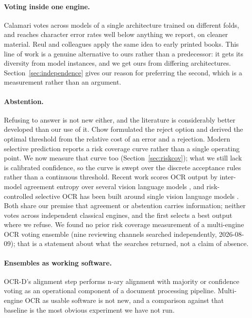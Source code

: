 \documentclass[11pt,a4paper]{article}
\begin{document}
\paragraph{Voting inside one engine.} Calamari \cite{wick2018} votes across models of a
single architecture trained on different folds, and reaches character error rates well
below anything we report, on cleaner material. Reul and colleagues \cite{reul2018} apply
the same idea to early printed books. This line of work is a genuine alternative to ours
rather than a predecessor: it gets its diversity from model instances, and we get ours
from differing architectures. Section~\ref{sec:independence} gives our reason for
preferring the second, which is a measurement rather than an argument.

\paragraph{Abstention.} Refusing to answer is not new either, and the literature is
considerably better developed than our use of it. Chow \cite{chow1957,chow1970}
formulated the reject option and derived the optimal threshold from the relative cost of
an error and a rejection. Modern selective prediction \cite{elyaniv2010,geifman2017}
reports a risk coverage curve rather than a single operating point. We now measure that
curve too (Section~\ref{sec:riskcov}); what we still lack is calibrated confidence, so
the curve is swept over the discrete acceptance rules rather than a continuous
threshold. Recent work scores OCR output by inter-model agreement entropy over several
vision language models \cite{zhang2025consensus}, and risk-controlled selective OCR has
been built around single vision language models \cite{geomrisk2026}. Both share our
premise that agreement or abstention carries information; neither votes across
independent classical engines, and the first selects a best output where we refuse. We
found no prior risk coverage measurement of a multi-engine OCR voting ensemble (nine
reviewing channels searched independently, 2026-08-09); that is a statement about what
the searches returned, not a claim of absence.

\paragraph{Ensembles as working software.} OCR-D's alignment step performs n-ary
alignment with majority or confidence voting as an operational component of a document
processing pipeline. Multi-engine OCR as usable software is not new, and a comparison
against that baseline is the most obvious experiment we have not run.
\end{document}
